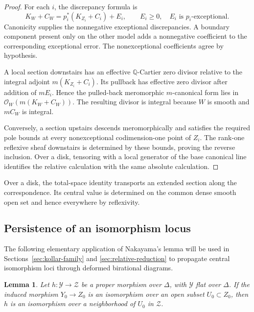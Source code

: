\documentclass[11pt,a4paper]{article}
\numberwithin{equation}{section}
\newtheorem{lemma}[theorem]{Lemma}
\theoremstyle{definition}
\theoremstyle{remark}
\newcommand{\Q}{\mathbb Q}\newcommand{\R}{\mathbb R}
\newcommand{\OO}{\mathcal O}\newcommand{\cX}{\mathcal X}
\begin{document}
\begin{proof}
For each $i$, the discrepancy formula is
\begin{equation}\label{eq:canonical-error}
 K_W+C_W=p_i^*(K_{Z_i}+C_i)+E_i,
 \qquad E_i\ge0,\quad E_i\text{ is }p_i\text{-exceptional}.
\end{equation}
Canonicity supplies the nonnegative exceptional discrepancies. A
boundary component present only on the other model adds a nonnegative
coefficient to the corresponding exceptional error. The nonexceptional
coefficients agree by hypothesis.

A local section downstairs has an effective $\Q$-Cartier zero divisor
relative to the integral adjoint $m(K_{Z_i}+C_i)$. Its pullback has
effective zero divisor after addition of $mE_i$. Hence the pulled-back
meromorphic $m$-canonical form lies in
$\OO_W(m(K_W+C_W))$. The resulting divisor is integral because
$W$ is smooth and $mC_W$ is integral.

Conversely, a section upstairs descends meromorphically and satisfies
the required pole bounds at every nonexceptional codimension-one point
of $Z_i$. The rank-one reflexive sheaf downstairs is determined by
these bounds, proving the reverse inclusion. Over a disk, tensoring
with a local generator of the base canonical line identifies the
relative calculation with the same absolute calculation.
\end{proof}

Over a disk, the total-space identity transports an extended section
along the correspondence. Its central value is determined on the common
dense smooth open set and hence everywhere by reflexivity.

\subsection{Persistence of an isomorphism locus}

The following elementary application of Nakayama's lemma will be
used in Sections~\ref{sec:kollar-family} and
\ref{sec:relative-reduction} to propagate central isomorphism loci
through deformed birational diagrams.

\begin{lemma}\label{lem:open-isomorphism}
Let $h:\mathcal Y\to\mathcal Z$ be a proper morphism over $\Delta$,
with $\mathcal Y$ flat over $\Delta$. If the induced morphism
$Y_0\to Z_0$ is an isomorphism over an open subset
$U_0\subset Z_0$, then $h$ is an isomorphism over a neighborhood
of $U_0$ in $\mathcal Z$.
\end{lemma}
\end{document}
